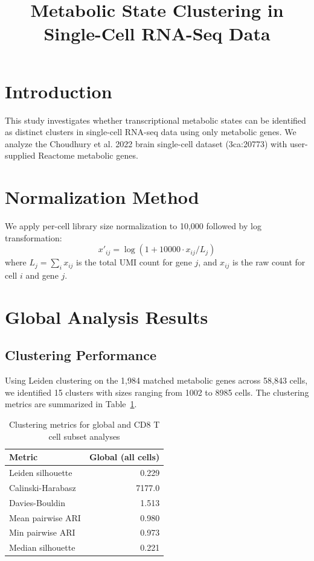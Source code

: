 \documentclass[11pt]{article}
\title{Metabolic State Clustering in Single-Cell RNA-Seq Data}
\author{}
\date{}
\begin{document}
\sloppy

\maketitle

\section{Introduction}

This study investigates whether transcriptional metabolic states can be identified as distinct clusters in single-cell RNA-seq data using only metabolic genes. We analyze the Choudhury et al. 2022 brain single-cell dataset (3ca:20773) with user-supplied Reactome metabolic genes.

\section{Normalization Method}

We apply per-cell library size normalization to 10,000 followed by log transformation:
\begin{equation}
\label{eq:normalization}
x'_{ij} = \log(1 + 10000 \cdot x_{ij} / L_j)
\end{equation}
where $L_j = \sum_i x_{ij}$ is the total UMI count for gene $j$, and $x_{ij}$ is the raw count for cell $i$ and gene $j$.

\section{Global Analysis Results}

\subsection{Clustering Performance}

Using Leiden clustering on the 1,984 matched metabolic genes across 58,843 cells, we identified 15 clusters with sizes ranging from 1002 to 8985 cells. The clustering metrics are summarized in Table~\ref{tab:clustering_metrics}.

\begin{table}
\centering
\caption{Clustering metrics for global and CD8 T cell subset analyses}
\label{tab:clustering_metrics}
\begin{tabular}{lr}
\toprule
Metric & Global (all cells) \\
\midrule
Leiden silhouette & 0.229 \\
Calinski-Harabasz & 7177.0 \\
Davies-Bouldin & 1.513 \\
Mean pairwise ARI & 0.980 \\
Min pairwise ARI & 0.973 \\
Median silhouette & 0.221 \\
\bottomrule
\end{tabular}
\end{table}
\end{document}

